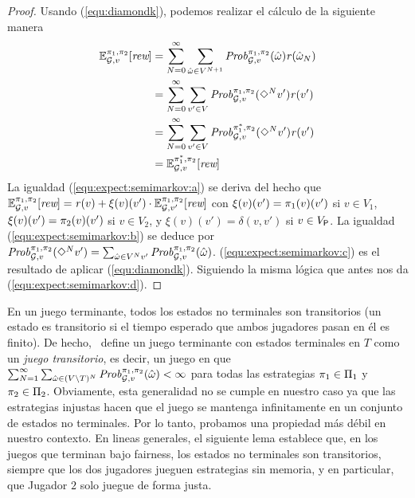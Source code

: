 \begin{proof}
  Usando (\ref{equ:diamondk}), podemos realizar el cálculo de la siguiente manera
  \begin{align}
  \mathbb{E}^{\pi_{1}, \pi_{2}}_{\mathcal{G},v}[\textit{rew}]   &  = \sum^\infty_{N=0} \sum_{\hat{\omega} \in V^{N+1}} \mathit{Prob}^{\pi_{1}, \pi_{2}}_{\mathcal{G},v}(\hat{\omega})\mathit{r}(\hat{\omega}_N) \label{equ:expect:semimarkov:a}\\
  & = \sum^\infty_{N=0} \sum_{v' \in V} \mathit{Prob}^{\pi_{1}, \pi_{2}}_{\mathcal{G},v}(\Diamond^N v')\mathit{r}(v') \label{equ:expect:semimarkov:b}\\
  & =  \sum^\infty_{N=0} \sum_{v' \in V} \mathit{Prob}^{\pi^*_{1}, \pi_{2}}_{\mathcal{G},v}(\Diamond^N v')\mathit{r}(v') \label{equ:expect:semimarkov:c}\\
  &  = \mathbb{E}^{\pi^*_{1}, \pi_{2}}_{\mathcal{G},v}[\textit{rew}] \label{equ:expect:semimarkov:d}
  \end{align}
  La igualdad (\ref{equ:expect:semimarkov:a}) se deriva del hecho que 
  $\mathbb{E}^{\pi_{1}, \pi_{2}}_{\mathcal{G},v}[\textit{rew}]= \mathit{r}(v) + \xi(v)(v') \cdot \mathbb{E}^{\pi_{1}, \pi_{2}}_{\mathcal{G},v'}[\textit{rew}]$
  con $\xi(v)(v')=\pi_{1}(v)(v')$ si $v\in V_1$,
  $\xi(v)(v')=\pi_{2}(v)(v')$ si $v\in V_2$, y $\xi(v)(v')=\delta(v,v')$
  si $v\in V_{\mathsf{P}}$.
  La igualdad (\ref{equ:expect:semimarkov:b}) se deduce por
  $\mathit{Prob}^{\pi_{1}, \pi_{2}}_{\mathcal{G},v}(\Diamond^N v')=\sum_{\hat{\omega} \in V^{N}v'} \mathit{Prob}^{\pi_{1}, \pi_{2}}_{\mathcal{G},v}(\hat{\omega})$.
  (\ref{equ:expect:semimarkov:c}) es el resultado de aplicar
  (\ref{equ:diamondk}).
  Siguiendo la misma lógica que antes nos da (\ref{equ:expect:semimarkov:d}).
\qedhere
\end{proof}
%


En un juego terminante, todos los estados no terminales son transitorios (un estado es
transitorio si el tiempo esperado que ambos jugadores pasan en él es
finito). De hecho, \cite{FilarV96}~define un juego terminante con
estados terminales en $T$ como un \emph{juego transitorio}, es decir, un juego en
que $\sum^\infty_{N=1} \sum_{\hat{\omega} \in (V \setminus T)^{N}}
\mathit{Prob}^{\pi_{1}, \pi_{2}}_{\mathcal{G},v}(\hat{\omega}) < \infty$ para
todas las estrategias $\pi_{1}\in\Pi_{1}$ y $\pi_{2}\in\Pi_{2}$.
%
Obviamente, esta generalidad no se cumple en nuestro caso ya que las
estrategias injustas hacen que el juego se mantenga infinitamente en un conjunto de estados no terminales.
%
Por lo tanto, probamos una propiedad más débil en nuestro contexto. En lineas generales,
el siguiente lema establece que, en los juegos que terminan bajo fairness,
los estados no terminales son transitorios, siempre que los dos jugadores jueguen
estrategias sin memoria, y en particular, que Jugador $2$ solo juegue de forma
justa.

